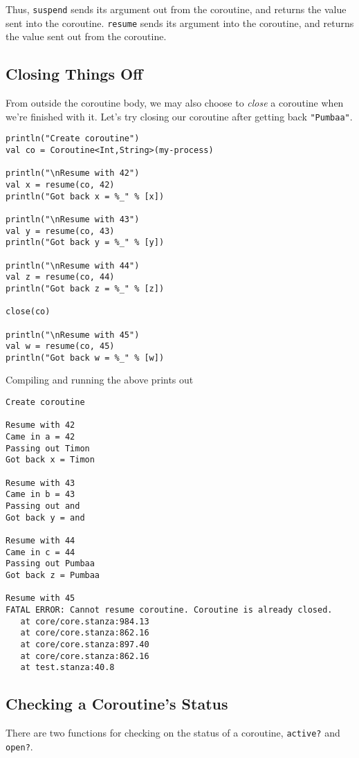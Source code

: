 \documentclass[10pt,oneside]{book}
\begin{document}
Thus, \texttt{\frenchspacing suspend} sends its argument out from the coroutine, and returns the value sent into the coroutine. \texttt{\frenchspacing resume} sends its argument into the coroutine, and returns the value sent out from the coroutine.

\subsection*{Closing Things Off}
From outside the coroutine body, we may also choose to {\em close} a coroutine when we're finished with it. Let's try closing our coroutine after getting back \texttt{\frenchspacing "Pumbaa"}.

\begin{lstlisting}
println("Create coroutine")
val co = Coroutine<Int,String>(my-process)

println("\nResume with 42")
val x = resume(co, 42)
println("Got back x = %_" % [x])

println("\nResume with 43")
val y = resume(co, 43)
println("Got back y = %_" % [y])

println("\nResume with 44")
val z = resume(co, 44)
println("Got back z = %_" % [z])

close(co)

println("\nResume with 45")
val w = resume(co, 45)
println("Got back w = %_" % [w])
\end{lstlisting}

Compiling and running the above prints out
\begin{lstlisting}
Create coroutine

Resume with 42
Came in a = 42
Passing out Timon
Got back x = Timon

Resume with 43
Came in b = 43
Passing out and
Got back y = and

Resume with 44
Came in c = 44
Passing out Pumbaa
Got back z = Pumbaa

Resume with 45
FATAL ERROR: Cannot resume coroutine. Coroutine is already closed.
   at core/core.stanza:984.13
   at core/core.stanza:862.16
   at core/core.stanza:897.40
   at core/core.stanza:862.16
   at test.stanza:40.8
\end{lstlisting}

\subsection*{Checking a Coroutine's Status}
There are two functions for checking on the status of a coroutine, \texttt{\frenchspacing active?} and \texttt{\frenchspacing open?}. 
\end{document}
